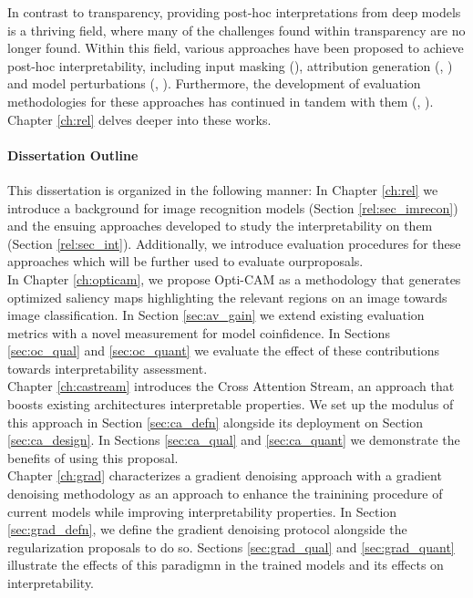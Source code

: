 In contrast to transparency, providing post-hoc interpretations from deep models is a 
thriving field, where many of the challenges found within transparency are no longer found.
Within this field, various approaches have been proposed to achieve post-hoc interpretability,
including input masking (\cite{petsiuk2018rise}), attribution generation (\cite{NIPS2017_7062}, 
\cite{zhou2016learning}) and model perturbations 
(\cite{fong2017interpretable}, \cite{fong2019understanding}). Furthermore, the development of 
evaluation methodologies for these approaches has continued in tandem with them 
(\cite{choe2020evaluating}, \cite{chattopadhay2018grad}). Chapter \ref{ch:rel} delves deeper into 
these works. 

\paragraph{Dissertation Outline}
\noindent This dissertation is organized in the following manner: In Chapter \ref{ch:rel} we 
introduce a background for image recognition models (Section \ref{rel:sec_imrecon}) and the ensuing 
approaches developed to study the interpretability on them (Section \ref{rel:sec_int}). 
Additionally, we introduce evaluation procedures for these approaches which will be further used to 
evaluate ourproposals.\\

\noindent In Chapter \ref{ch:opticam}, we propose Opti-CAM as a methodology that generates 
optimized saliency maps highlighting the relevant regions on an image towards image classification. 
In Section \ref{sec:av_gain} we extend existing evaluation metrics with a novel measurement for 
model coinfidence. 
In Sections \ref{sec:oc_qual} and \ref{sec:oc_quant} we evaluate the effect of these contributions 
towards interpretability assessment.\\

\noindent Chapter \ref{ch:castream} introduces the Cross Attention Stream, an approach that boosts existing 
architectures interpretable properties. We set up the modulus of this approach in 
Section \ref{sec:ca_defn} alongside its deployment on Section \ref{sec:ca_design}. 
In Sections \ref{sec:ca_qual} and \ref{sec:ca_quant} we demonstrate the benefits of using this
proposal.\\

\noindent Chapter \ref{ch:grad} characterizes a gradient denoising approach with a gradient denoising 
methodology as an approach to enhance the trainining procedure of current models while improving 
interpretability properties. In Section \ref{sec:grad_defn}, we define the gradient denoising 
protocol alongside the regularization proposals to do so.
Sections \ref{sec:grad_qual} and \ref{sec:grad_quant} illustrate the effects of this paradigmn
in the trained models and its effects on interpretability.\\

